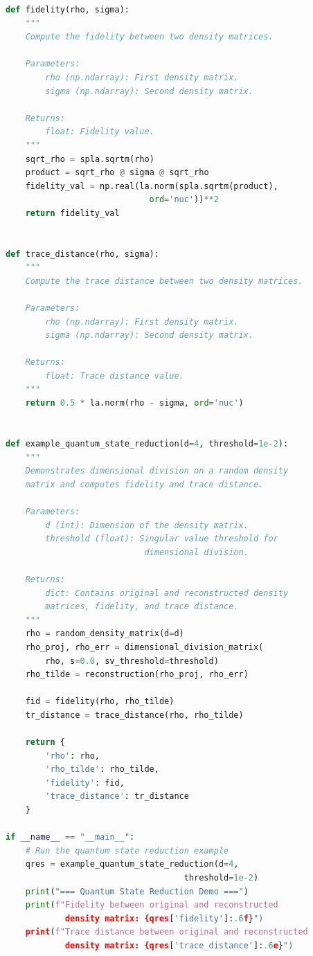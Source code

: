 \documentclass[sn-mathphys-num]{sn-jnl}
\theoremstyle{thmstyleone}
\theoremstyle{thmstyletwo}
\theoremstyle{thmstylethree}
\begin{document}
\begin{appendices}
\begin{lstlisting}[language=Python,caption={Quantum state reduction example using the dimensional division framework.},label={lst:quantum-state-reduction}]
def fidelity(rho, sigma):
    """
    Compute the fidelity between two density matrices.
    
    Parameters:
        rho (np.ndarray): First density matrix.
        sigma (np.ndarray): Second density matrix.
    
    Returns:
        float: Fidelity value.
    """
    sqrt_rho = spla.sqrtm(rho)
    product = sqrt_rho @ sigma @ sqrt_rho
    fidelity_val = np.real(la.norm(spla.sqrtm(product),
                             ord='nuc'))**2
    return fidelity_val


def trace_distance(rho, sigma):
    """
    Compute the trace distance between two density matrices.
    
    Parameters:
        rho (np.ndarray): First density matrix.
        sigma (np.ndarray): Second density matrix.
    
    Returns:
        float: Trace distance value.
    """
    return 0.5 * la.norm(rho - sigma, ord='nuc')


def example_quantum_state_reduction(d=4, threshold=1e-2):
    """
    Demonstrates dimensional division on a random density 
    matrix and computes fidelity and trace distance.
    
    Parameters:
        d (int): Dimension of the density matrix.
        threshold (float): Singular value threshold for 
                            dimensional division.
    
    Returns:
        dict: Contains original and reconstructed density 
        matrices, fidelity, and trace distance.
    """
    rho = random_density_matrix(d=d)
    rho_proj, rho_err = dimensional_division_matrix(
        rho, s=0.0, sv_threshold=threshold)
    rho_tilde = reconstruction(rho_proj, rho_err)
    
    fid = fidelity(rho, rho_tilde)
    tr_distance = trace_distance(rho, rho_tilde)
    
    return {
        'rho': rho,
        'rho_tilde': rho_tilde,
        'fidelity': fid,
        'trace_distance': tr_distance
    }

if __name__ == "__main__":
    # Run the quantum state reduction example
    qres = example_quantum_state_reduction(d=4, 
                                    threshold=1e-2)
    print("=== Quantum State Reduction Demo ===")
    print(f"Fidelity between original and reconstructed 
            density matrix: {qres['fidelity']:.6f}")
    print(f"Trace distance between original and reconstructed 
            density matrix: {qres['trace_distance']:.6e}")
\end{lstlisting}


\end{appendices}
\end{document}
